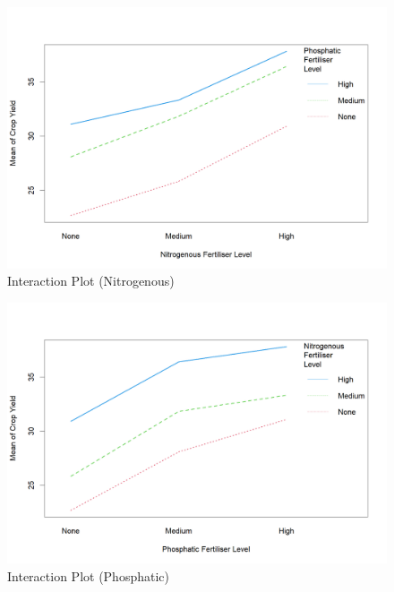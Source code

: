 \documentclass[12pt]{article}
\begin{document}
\begin{figure}[ht]
    \centering
    \includegraphics[width=\linewidth]{Figures/Interaction Plot (Nitrogenous).png}
    \caption{Interaction Plot (Nitrogenous)}
\end{figure}

\begin{figure}[ht]
    \centering
    \includegraphics[width=\linewidth]{Figures/Interaction Plot (Phosphatic).png}
    \caption{Interaction Plot (Phosphatic)}
\end{figure}
\end{document}
